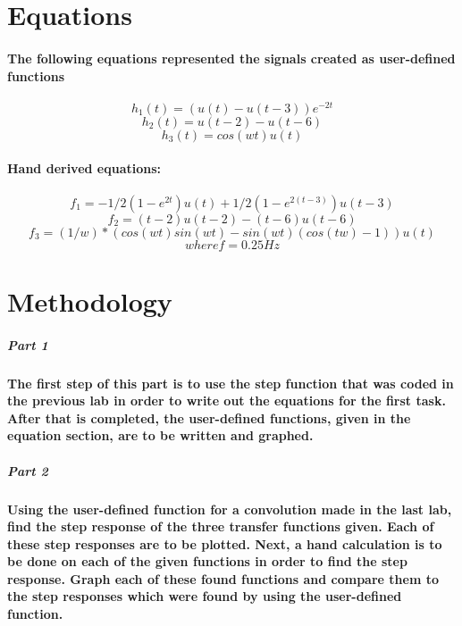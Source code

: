 \documentclass[12pt,a4paper]{article}
\begin{document}
\section{Equations}\label{sec:lit-rev}

\paragraph{The following equations represented the signals created as user-defined functions}

$$h_1(t) = (u(t)-u(t-3))e^{-2t}$$
$$h_2(t) = u(t-2) - u(t-6)$$ 
$$h_3(t) = cos(wt)u(t)$$

\paragraph{Hand derived equations:}

$$f_1 = -1/2(1-e^{2t})u(t) + 1/2(1 - e^{2(t-3)})u(t-3)$$
$$f_2 = (t-2)u(t-2) - (t-6)u(t-6)$$
$$f_3 = (1/w)*(cos(wt)sin(wt) - sin(wt)(cos(tw)-1))u(t)$$
$$where f = 0.25 Hz$$

\section{Methodology}\label{sec:meth}

\subparagraph{\large Part 1}

\paragraph{The first step of this part is to use the step function that was coded in the previous lab in order to write out the equations for the first task. After that is completed, the user-defined functions, given in the equation section, are to be written and graphed.}

\subparagraph{\large Part 2}

\paragraph{Using the user-defined function for a convolution made in the last lab, find the step response of the three transfer functions given. Each of these step responses are to be plotted. Next, a hand calculation is to be done on each of the given functions in order to find the step response. Graph each of these found functions and compare them to the step responses which were found by using the user-defined function.}
\end{document}
